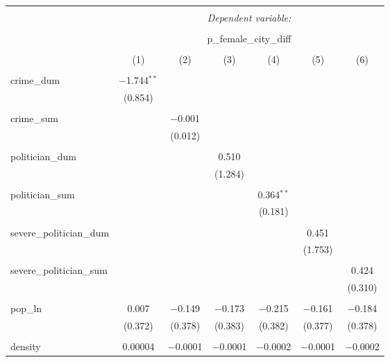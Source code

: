 
\begin{table}[!htbp] \centering 
  \caption{} 
  \label{} 
\begin{tabular}{@{\extracolsep{5pt}}lcccccc} 
\\[-1.8ex]\hline 
\hline \\[-1.8ex] 
 & \multicolumn{6}{c}{\textit{Dependent variable:}} \\ 
\cline{2-7} 
\\[-1.8ex] & \multicolumn{6}{c}{p\_female\_city\_diff} \\ 
\\[-1.8ex] & (1) & (2) & (3) & (4) & (5) & (6)\\ 
\hline \\[-1.8ex] 
 crime\_dum & $-$1.744$^{**}$ &  &  &  &  &  \\ 
  & (0.854) &  &  &  &  &  \\ 
  & & & & & & \\ 
 crime\_sum &  & $-$0.001 &  &  &  &  \\ 
  &  & (0.012) &  &  &  &  \\ 
  & & & & & & \\ 
 politician\_dum &  &  & 0.510 &  &  &  \\ 
  &  &  & (1.284) &  &  &  \\ 
  & & & & & & \\ 
 politician\_sum &  &  &  & 0.364$^{**}$ &  &  \\ 
  &  &  &  & (0.181) &  &  \\ 
  & & & & & & \\ 
 severe\_politician\_dum &  &  &  &  & 0.451 &  \\ 
  &  &  &  &  & (1.753) &  \\ 
  & & & & & & \\ 
 severe\_politician\_sum &  &  &  &  &  & 0.424 \\ 
  &  &  &  &  &  & (0.310) \\ 
  & & & & & & \\ 
 pop\_ln & 0.007 & $-$0.149 & $-$0.173 & $-$0.215 & $-$0.161 & $-$0.184 \\ 
  & (0.372) & (0.378) & (0.383) & (0.382) & (0.377) & (0.378) \\ 
  & & & & & & \\ 
 density & 0.00004 & $-$0.0001 & $-$0.0001 & $-$0.0002 & $-$0.0001 & $-$0.0002 \\ 

\end{tabular}
\end{table}
